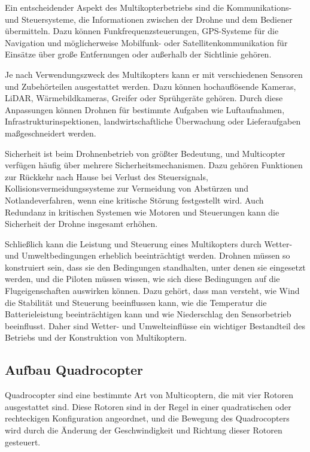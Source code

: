Ein entscheidender Aspekt des Multikopterbetriebs sind die Kommunikations- und Steuersysteme, die Informationen zwischen der Drohne und dem Bediener übermitteln. Dazu können Funkfrequenzsteuerungen, GPS-Systeme für die Navigation und möglicherweise Mobilfunk- oder Satellitenkommunikation für Einsätze über große Entfernungen oder außerhalb der Sichtlinie gehören.

Je nach Verwendungszweck des Multikopters kann er mit verschiedenen Sensoren und Zubehörteilen ausgestattet werden. Dazu können hochauflösende Kameras, LiDAR, Wärmebildkameras, Greifer oder Sprühgeräte gehören. Durch diese Anpassungen können Drohnen für bestimmte Aufgaben wie Luftaufnahmen, Infrastrukturinspektionen, landwirtschaftliche Überwachung oder Lieferaufgaben maßgeschneidert werden.

Sicherheit ist beim Drohnenbetrieb von größter Bedeutung, und Multicopter verfügen häufig über mehrere Sicherheitsmechanismen. Dazu gehören Funktionen zur Rückkehr nach Hause bei Verlust des Steuersignals, Kollisionsvermeidungssysteme zur Vermeidung von Abstürzen und Notlandeverfahren, wenn eine kritische Störung festgestellt wird. Auch Redundanz in kritischen Systemen wie Motoren und Steuerungen kann die Sicherheit der Drohne insgesamt erhöhen.

Schließlich kann die Leistung und Steuerung eines Multikopters durch Wetter- und Umweltbedingungen erheblich beeinträchtigt werden. Drohnen müssen so konstruiert sein, dass sie den Bedingungen standhalten, unter denen sie eingesetzt werden, und die Piloten müssen wissen, wie sich diese Bedingungen auf die Flugeigenschaften auswirken können. Dazu gehört, dass man versteht, wie Wind die Stabilität und Steuerung beeinflussen kann, wie die Temperatur die Batterieleistung beeinträchtigen kann und wie Niederschlag den Sensorbetrieb beeinflusst. Daher sind Wetter- und Umwelteinflüsse ein wichtiger Bestandteil des Betriebs und der Konstruktion von Multikoptern.

\cite[vgl.][UAV Fundamentals]{Valavanis2015}
\subsection{Aufbau Quadrocopter}

Quadrocopter sind eine bestimmte Art von Multicoptern, die mit vier Rotoren ausgestattet sind. Diese Rotoren sind in der Regel in einer quadratischen oder rechteckigen Konfiguration angeordnet, und die Bewegung des Quadrocopters wird durch die Änderung der Geschwindigkeit und Richtung dieser Rotoren gesteuert.

